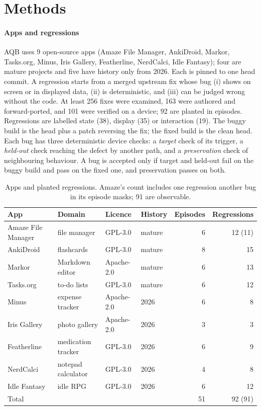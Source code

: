 \documentclass[10pt,letterpaper]{article}
\newcommand{\aqb}{AQB\xspace}
\begin{document}
\section{Methods}
\paragraph{Apps and regressions}
\aqb uses 9 open-source apps (Amaze File Manager, AnkiDroid, Markor, Tasks.org, Minus, Iris Gallery,
Featherline, NerdCalci, Idle Fantasy); four are mature projects and five have history only from 2026.
Each is pinned to one head commit. A regression starts from a merged upstream fix whose bug (i) shows
on screen or in displayed data, (ii) is deterministic, and (iii) can be judged wrong without the code.
At least 256 fixes were examined, 163 were authored and forward-ported, and 101 were verified on a
device; 92 are planted in episodes. Regressions are labelled state (38), display (35) or interaction
(19). The buggy build is the head plus a patch reversing the fix; the fixed build is the clean head.
Each bug has three deterministic device checks: a \emph{target} check of its trigger, a
\emph{held-out} check reaching the defect by another path, and a \emph{preservation} check of
neighbouring behaviour. A bug is accepted only if target and held-out fail on the buggy build and pass
on the fixed one, and preservation passes on both.

\begin{table}[t]
  \centering
  \caption{Apps and planted regressions. Amaze's count includes one regression another bug in its
  episode masks; 91 are observable.}
  \label{tab:apps}
  \small\setlength{\tabcolsep}{6pt}
  \begin{tabular}{@{}llllrr@{}}
    \toprule
    App & Domain & Licence & History & Episodes & Regressions \\
    \midrule
    Amaze File Manager & file manager & GPL-3.0 & mature & 6 & 12 (11) \\
    AnkiDroid & flashcards & GPL-3.0 & mature & 8 & 15 \\
    Markor & Markdown editor & Apache-2.0 & mature & 6 & 13 \\
    Tasks.org & to-do lists & GPL-3.0 & mature & 6 & 12 \\
    Minus & expense tracker & Apache-2.0 & 2026 & 6 & 8 \\
    Iris Gallery & photo gallery & Apache-2.0 & 2026 & 3 & 3 \\
    Featherline & medication tracker & GPL-3.0 & 2026 & 6 & 9 \\
    NerdCalci & notepad calculator & GPL-3.0 & 2026 & 4 & 8 \\
    Idle Fantasy & idle RPG & GPL-3.0 & 2026 & 6 & 12 \\
    \midrule
    Total & & & & 51 & 92 (91) \\
    \bottomrule
  \end{tabular}
\end{table}
\end{document}
